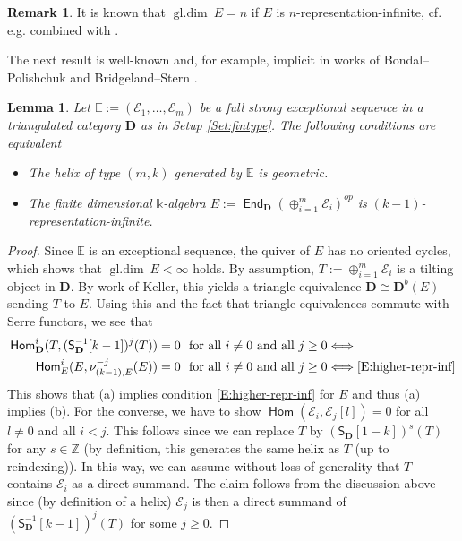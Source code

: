 \documentclass[a4paper,11pt, reqno]{amsart}
\def\E{\mathbb E}
\def\Z{\mathbb Z}
\def\DD{\mathbf D}
\def\sE{\mathscr{E}}
\def\gldim{{\operatorname{gl.dim}\ }}
\newcommand{\opname}[1]{\operatorname{\mathsf{#1}}}
\newcommand{\Hom}{\opname{Hom}}
\newcommand{\End}{\opname{End}}
\newcommand{\op}{^{op}}
\def\Db{\DD^b}
\newcommand{\bS}{\mathsf{S}}
\theoremstyle{plain}
\newtheorem{lemma}[dummy]{Lemma}
\theoremstyle{definition}
\newtheorem{remark}[dummy]{Remark}
\numberwithin{equation}{section}
\newlength{\arrow}
\begin{document}
\begin{remark} \label{R:GldimHigherHered}
    It is known that $\gldim E = n$ if $E$ is $n$-representation-infinite, cf. e.g. \cite[Lem. 1.4]{Tomonaga2510} combined with \cite[Definition 2.7]{HIO}. 
\end{remark}


The next result is well-known and, for example, implicit in works of Bondal--Polishchuk \cite{bondal-polishchuk} and Bridgeland--Stern \cite{BridgelandStern}.

\begin{lemma}\label{L:GeomHelicesandhigherreprinfinite}
    Let $\E:=(\sE_1, \ldots, \sE_{{m}})$ be a full strong exceptional sequence in a triangulated category $\DD$ as in Setup \ref{Set:fintype}.
    The following conditions are equivalent
    \begin{itemize}
    \item[(a)] The helix of type $({m}, k)$ generated by $\E$ is \emph{geometric}.
    \item[(b)] The finite dimensional $\mathbb k$-algebra $E:=\End_\DD(\oplus_{i=1}^{{m}} \sE_i)\op$ is $(k-1)$-representation-infinite.
    \end{itemize}
\end{lemma}
\begin{proof}
Since $\E$ is an exceptional sequence, the quiver of $E$ has no oriented cycles, which shows that $\gldim E<\infty$ holds.
By assumption, $T:=\oplus_{i=1}^m \sE_i$ is a tilting object in $\DD$. By work of Keller, this yields a triangle equivalence $\DD \cong \Db(E)$ sending $T$ to $E$. Using this and the fact that triangle equivalences commute with Serre functors, we see that
\begin{align*}
 \Hom_\DD^i(T, (\bS^{-1}_\DD[k-1])^j(T))=0 \ \text{  for all } i \neq 0 \text{  and all } j\geq 0  &\Longleftrightarrow \\
\Hom_E^i(E, \nu_{(k-1),E}^{-j}(E))=0 \ \text{  for all } i \neq 0 \text{  and all } j\geq 0 
&\Longleftrightarrow \eqref{E:higher-repr-inf}
\end{align*}
This shows that (a) implies condition \eqref{E:higher-repr-inf} for $E$ and thus (a) implies (b).   
For the converse, we have to show $\Hom(\sE_i, \sE_j [l])=0$ for all $l \neq 0$ and all $i<j$. This follows since we can replace $T$ by $(\bS_\DD[1-k])^s(T)$ for any $s\in \Z$ (by definition, this generates the same helix as $T$ (up to reindexing)). In this way, we can assume without loss of generality that $T$ contains $\sE_i$ as a direct summand. The claim follows from the discussion above since (by definition of a helix) $\sE_j$ is then a direct summand of $(\bS^{-1}_\DD[k-1])^j(T)$ for some $j \geq 0$.
\end{proof}
\end{document}
